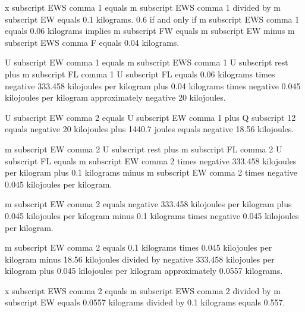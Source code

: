 x subscript EWS comma 1 equals m subscript EWS comma 1 divided by m subscript EW equals 0.1 kilograms. 0.6 if and only if m subscript EWS comma 1 equals 0.06 kilograms implies m subscript FW equals m subscript EW minus m subscript EWS comma F equals 0.04 kilograms.

U subscript EW comma 1 equals m subscript EWS comma 1 U subscript rest plus m subscript FL comma 1 U subscript FL equals 0.06 kilograms times negative 333.458 kilojoules per kilogram plus 0.04 kilograms times negative 0.045 kilojoules per kilogram approximately negative 20 kilojoules.

U subscript EW comma 2 equals U subscript EW comma 1 plus Q subscript 12 equals negative 20 kilojoules plus 1440.7 joules equals negative 18.56 kilojoules.

m subscript EW comma 2 U subscript rest plus m subscript FL comma 2 U subscript FL equals m subscript EW comma 2 times negative 333.458 kilojoules per kilogram plus 0.1 kilograms minus m subscript EW comma 2 times negative 0.045 kilojoules per kilogram.

m subscript EW comma 2 equals negative 333.458 kilojoules per kilogram plus 0.045 kilojoules per kilogram minus 0.1 kilograms times negative 0.045 kilojoules per kilogram.

m subscript EW comma 2 equals 0.1 kilograms times 0.045 kilojoules per kilogram minus 18.56 kilojoules divided by negative 333.458 kilojoules per kilogram plus 0.045 kilojoules per kilogram approximately 0.0557 kilograms.

x subscript EWS comma 2 equals m subscript EWS comma 2 divided by m subscript EW equals 0.0557 kilograms divided by 0.1 kilograms equals 0.557.